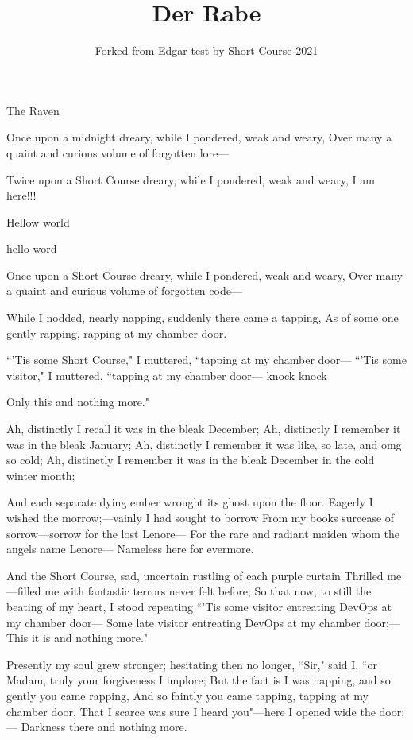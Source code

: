 \documentclass{article}
\title{Der Rabe}
\author{Forked from Edgar test by Short Course 2021} - edited by bynjh007
\begin{document}
\maketitle The Raven



Once upon a midnight dreary, while I pondered, weak and weary,
Over many a quaint and curious volume of forgotten lore---

Twice upon a Short Course dreary, while I pondered, weak and weary,
I am here!!!

Hellow world 

hello word

Once upon a Short Course dreary, while I pondered, weak and weary,
Over many a quaint and curious volume of forgotten code---

  While I nodded, nearly napping, suddenly there came a tapping,
As of some one gently rapping, rapping at my chamber door.

``’Tis some Short Course," I muttered, ``tapping at my chamber door---
``’Tis some visitor," I muttered, ``tapping at my chamber door--- knock knock

Only this and nothing more."



Ah, distinctly I recall it was in the bleak December;
Ah, distinctly I remember it was in the bleak January;
Ah, distinctly I remember it was like, so late, and omg so cold;
Ah, distinctly I remember it was in the bleak December in the cold winter month;


And each separate dying ember wrought its ghost upon the floor.
Eagerly I wished the morrow;---vainly I had sought to borrow
From my books surcease of sorrow---sorrow for the lost Lenore---
For the rare and radiant maiden whom the angels name Lenore---
Nameless here for evermore.

And the Short Course, sad, uncertain rustling of each purple curtain
Thrilled me---filled me with fantastic terrors never felt before;
So that now, to still the beating of my heart, I stood repeating
``’Tis some visitor entreating DevOps at my chamber door---
Some late visitor entreating DevOps at my chamber door;---
This it is and nothing more."

Presently my soul grew stronger; hesitating then no longer,
``Sir," said I, ``or Madam, truly your forgiveness I implore;
But the fact is I was napping, and so gently you came rapping,
And so faintly you came tapping, tapping at my chamber door,
That I scarce was sure I heard you"---here I opened wide the door;---
Darkness there and nothing more.
\end{document}
